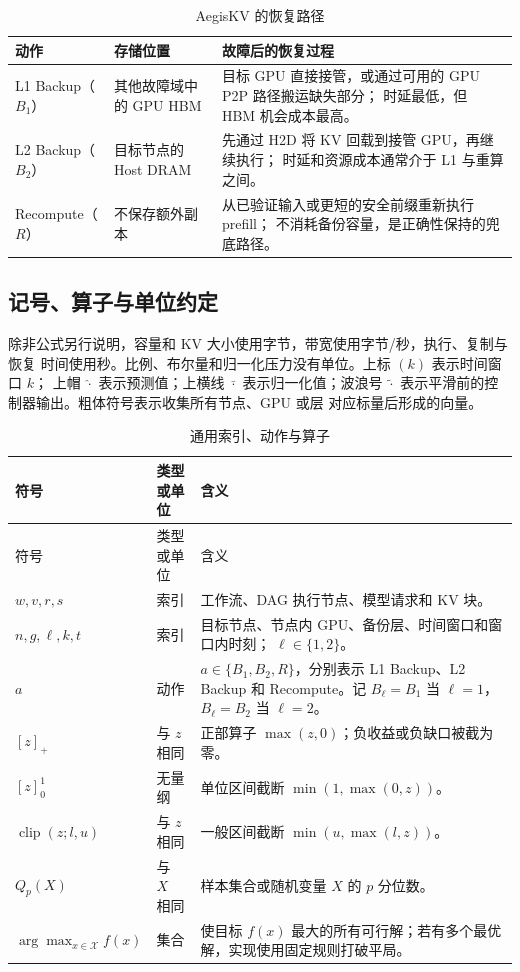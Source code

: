 \documentclass[UTF8,11pt,a4paper,fontset=fandol]{ctexart}
\newcommand{\pos}[1]{\left[#1\right]_+}
\newcommand{\clip}[1]{\left[#1\right]_0^1}
\newcommand{\BOne}{B_1}
\newcommand{\BTwo}{B_2}
\newcommand{\Recompute}{R}
\begin{document}
\begin{table}[htbp]
  \centering
  \caption{AegisKV 的恢复路径}
  \label{tab:recovery-tiers}
  \begin{tabularx}{\textwidth}{p{}p{}X}
    \toprule
    动作 & 存储位置 & 故障后的恢复过程 \\
    \midrule
    L1 Backup（$\BOne$）
      & 其他故障域中的 GPU HBM
      & 目标 GPU 直接接管，或通过可用的 GPU P2P 路径搬运缺失部分；
        时延最低，但 HBM 机会成本最高。 \\
    L2 Backup（$\BTwo$）
      & 目标节点的 Host DRAM
      & 先通过 H2D 将 KV 回载到接管 GPU，再继续执行；
        时延和资源成本通常介于 L1 与重算之间。 \\
    Recompute（$\Recompute$）
      & 不保存额外副本
      & 从已验证输入或更短的安全前缀重新执行 prefill；
        不消耗备份容量，是正确性保持的兜底路径。 \\
    \bottomrule
  \end{tabularx}
\end{table}

\subsection{记号、算子与单位约定}

除非公式另行说明，容量和 KV 大小使用字节，带宽使用字节/秒，执行、复制与恢复
时间使用秒。比例、布尔量和归一化压力没有单位。上标 $(k)$ 表示时间窗口 $k$；
上帽 $\widehat{\cdot}$ 表示预测值；上横线 $\bar{\cdot}$ 表示归一化值；波浪号
$\widetilde{\cdot}$ 表示平滑前的控制器输出。粗体符号表示收集所有节点、GPU 或层
对应标量后形成的向量。

\begin{longtable}{p{}p{}p{}}
  \caption{通用索引、动作与算子}\label{tab:notation}\\
  \toprule
  符号 & 类型或单位 & 含义 \\
  \midrule
  \endfirsthead
  \toprule
  符号 & 类型或单位 & 含义 \\
  \midrule
  \endhead
  $w,v,r,s$ & 索引
    & 工作流、DAG 执行节点、模型请求和 KV 块。 \\
  $n,g,\ell,k,t$ & 索引
    & 目标节点、节点内 GPU、备份层、时间窗口和窗口内时刻；
      $\ell\in\{1,2\}$。 \\
  $a$ & 动作
    & $a\in\{\BOne,\BTwo,\Recompute\}$，分别表示 L1 Backup、L2 Backup
      和 Recompute。记 $B_\ell=\BOne$ 当 $\ell=1$，$B_\ell=\BTwo$ 当
      $\ell=2$。 \\
  $\pos{z}$ & 与 $z$ 相同
    & 正部算子 $\max(z,0)$；负收益或负缺口被截为零。 \\
  $\clip{z}$ & 无量纲
    & 单位区间截断 $\min(1,\max(0,z))$。 \\
  $\operatorname{clip}(z;l,u)$ & 与 $z$ 相同
    & 一般区间截断 $\min(u,\max(l,z))$。 \\
  $Q_p(X)$ & 与 $X$ 相同
    & 样本集合或随机变量 $X$ 的 $p$ 分位数。 \\
  $\arg\max_{x\in\mathcal X}f(x)$ & 集合
    & 使目标 $f(x)$ 最大的所有可行解；若有多个最优解，实现使用固定规则打破平局。 \\
  \bottomrule
\end{longtable}
\end{document}

